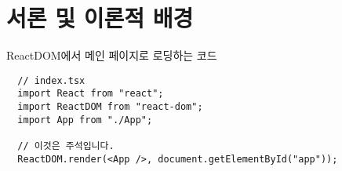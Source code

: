 \chapter{서론 및 이론적 배경}
\label{chap:introduction}

ReactDOM에서 메인 페이지로 로딩하는 코드

\begin{lstlisting}
  // index.tsx
  import React from "react";
  import ReactDOM from "react-dom";
  import App from "./App";
  
  // 이것은 주석입니다.
  ReactDOM.render(<App />, document.getElementById("app"));
\end{lstlisting}
